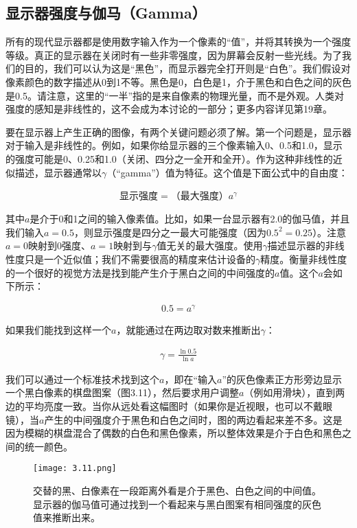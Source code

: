 \documentclass[lang=cn,12pt]{elegantbook}
\begin{document}
\subsection{显示器强度与伽马（Gamma）}

所有的现代显示器都是使用数字输入作为一个像素的“值”，并将其转换为一个强度等级。真正的显示器在关闭时有一些非零强度，因为屏幕会反射一些光线。为了我们的目的，我们可以认为这是“黑色”，而显示器完全打开则是“白色”。我们假设对像素颜色的数字描述从0到1不等。黑色是0，白色是1，介于黑色和白色之间的灰色是0.5。请注意，这里的“一半”指的是来自像素的物理光量，而不是外观。人类对强度的感知是非线性的，这不会成为本讨论的一部分；更多内容详见第19章。

要在显示器上产生正确的图像，有两个关键问题必须了解。第一个问题是，显示器对于输入是非线性的。例如，如果你给显示器的三个像素输入0、0.5和1.0，显示的强度可能是0、0.25和1.0（关闭、四分之一全开和全开）。作为这种非线性的近似描述，显示器通常以$\gamma $（“gamma”）值为特征。这个值是下面公式中的自由度：

\begin{align}
  \mbox{显示强度}=\mbox{（最大强度）}a^\gamma
\end{align}

其中$a$是介于0和1之间的输入像素值。比如，如果一台显示器有2.0的伽马值，并且我们输入$a=0.5$，则显示强度是四分之一最大可能强度（因为$0.5^2=0.25$）。注意$a=0$映射到0强度、$a=1$映射到与$\gamma$值无关的最大强度。使用$\gamma$描述显示器的非线性度只是一个近似值；我们不需要很高的精度来估计设备的$\gamma$精度。衡量非线性度的一个很好的视觉方法是找到能产生介于黑白之间的中间强度的$a$值。这个$a$会如下所示：

\[
  \begin{aligned}
  0.5 = a^\gamma 
  \end{aligned}
\]

如果我们能找到这样一个$a$，就能通过在两边取对数来推断出$\gamma$：

\[
  \begin{aligned}
  \gamma = \frac{\ln 0.5}{\ln a} 
  \end{aligned}
\]

我们可以通过一个标准技术找到这个$a$，即在“输入$a$”的灰色像素正方形旁边显示一个黑白像素的棋盘图案（图3.11），然后要求用户调整$a$（例如用滑块），直到两边的平均亮度一致。当你从远处看这幅图时（如果你是近视眼，也可以不戴眼镜），当$a$产生的中间强度介于黑色和白色之间时，图的两边看起来差不多。这是因为模糊的棋盘混合了偶数的白色和黑色像素，所以整体效果是介于白色和黑色之间的统一颜色。

\begin{figure}[htb]
  \centering
  \texttt{[image: 3.11.png]}
  \caption{交替的黑、白像素在一段距离外看是介于黑色、白色之间的中间值。显示器的伽马值可通过找到一个看起来与黑白图案有相同强度的灰色值来推断出来。}
\end{figure}
\end{document}
